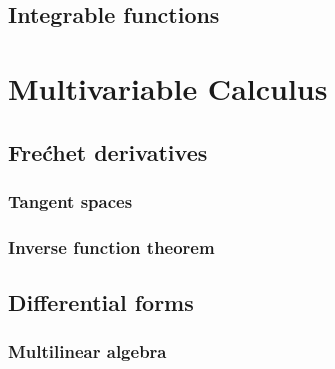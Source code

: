 \documentclass{../../large}
\begin{document}
\chapter{Integrable functions}
\section{}

\begin{prb}
\end{prb}













\part{Multivariable Calculus}
\chapter{Fre\'chet derivatives}
\section{Tangent spaces}
\begin{prb}

\end{prb}

\section{Inverse function theorem}






\chapter{Differential forms}
\section{Multilinear algebra}

\begin{prb}
\end{prb}
\end{document}
